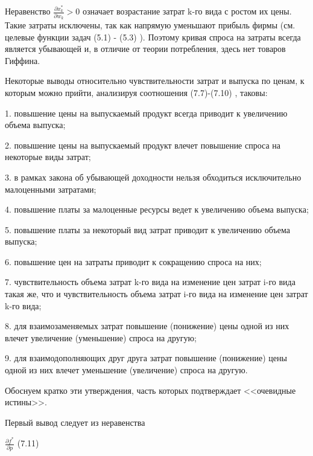\documentclass[12pt, 4paper]{book}
\begin{document}
{Неравенство $\frac{\partial x_{k}^{*}}{\partial w_k}>0$ означает возрастание затрат k-го вида с ростом их цены. Такие затраты исключены, так как напрямую уменьшают прибыль фирмы (см. целевые функции задач (5.1) - (5.3) ). Поэтому кривая спроса на затраты всегда является убывающей и, в отличие от теории потребления, здесь нет товаров Гиффина. 
\par

Некоторые выводы относительно чувствительности затрат и выпуска по ценам, к которым можно прийти, анализируя соотношения (7.7)-(7.10) , таковы: 
\par

1.	повышение цены на выпускаемый продукт всегда приводит к увеличению объема выпуска; 
\par

2.	повышение цены на выпускаемый продукт влечет повышение спроса на некоторые виды затрат; 
\par

3.	в рамках закона об убывающей доходности нельзя обходиться исключительно малоценными затратами; 
\par

4.	повышение платы за малоценные ресурсы ведет к увеличению объема выпуска; 
\par

5.	повышение платы за некоторый вид затрат приводит к увеличению объема выпуска; 
\par

6.	повышение цен на затраты приводит к сокращению спроса на них; 
\par

7.	чувствительность объема затрат k-го вида на изменение цен затрат i-го вида такая же, что и чувствительность объема затрат i-го вида на изменение цен затрат k-го вида; 
\par

8.	для взаимозаменяемых затрат повышение (понижение) цены одной из них влечет увеличение (уменьшение) спроса на другую; 
\par

9.	для взаимодополняющих друг друга затрат повышение (понижение) цены одной из них влечет уменьшение (увеличение) спроса на другую.
\newline
\par

Обоснуем кратко эти утверждения, часть которых подтверждает <<очевидные истины>>.
\par

Первый вывод следует из неравенства 
\begin{center}
$\frac{\partial f^{*}}{\partial p}$ (7.11)
\end{center}
\par

}
\end{document}

